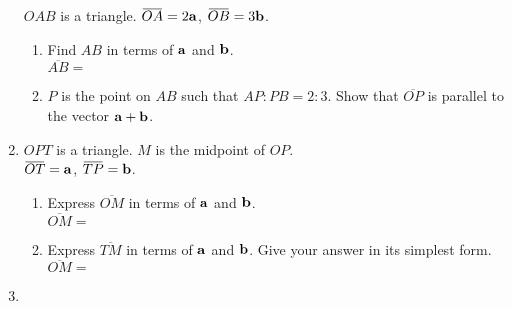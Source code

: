 \begin{enumerate}
\begin{figure}[H]
  \end{figure}
  $OAB$ is a triangle. $\overbar{OA} = 2\vb{a}$, $\overbar{OB} = 3\vb{b}$.
  \begin{enumerate}
    \item Find $AB$ in terms of $\vb{a}$ and $\vb{b}$.\\[2cm]\vspace*{0pt}\hfill$\overbar{AB} = $\dline
    \item $P$ is the point on $AB$ such that $AP : PB = 2 : 3$. Show that $\overbar{OP}$ is parallel to the vector $\vb{a} + \vb{b}$.
  \end{enumerate}
  \newpage
  \item \mbox{}
  \begin{figure}[H]
    \centering
  \end{figure}
  $OPT$ is a triangle. $M$ is the midpoint of $OP$.\\
  $\overbar{OT} = \vb{a}$, $\overbar{TP} = \vb{b}$.
  \begin{enumerate}
    \item Express $\overbar{OM}$ in terms of $\vb{a}$ and $\vb{b}$.\\[3cm]\vspace*{0pt}\hfill$\overbar{OM} = $\dline
    \item Express $\overbar{TM}$ in terms of $\vb{a}$ and $\vb{b}$. Give your answer in its simplest form.\\[3cm]\vspace*{0pt}\hfill$\overbar{OM} = $\dline
  \end{enumerate}
  \newpage
  \item \mbox{}
  \begin{figure}[H]
    \centering
\end{figure}
\end{enumerate}
